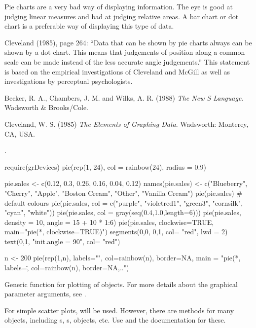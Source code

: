 %
\begin{Note}\relax
Pie charts are a very bad way of displaying information.
The eye is good at judging linear measures and bad at judging
relative areas.  A bar chart or dot chart is a preferable way of
displaying this type of data.

Cleveland (1985), page 264: ``Data that can be shown by pie charts
always can be shown by a dot chart.  This means that judgements of
position along a common scale can be made instead of the less
accurate angle judgements.''
This statement is based on the empirical investigations of Cleveland
and McGill as well as investigations by perceptual psychologists.
\end{Note}
%
\begin{References}\relax
Becker, R. A., Chambers, J. M. and Wilks, A. R. (1988)
\emph{The New S Language}.
Wadsworth \& Brooks/Cole.

Cleveland, W. S. (1985)
\emph{The Elements of Graphing Data}.
Wadsworth: Monterey, CA, USA.
\end{References}
%
\begin{SeeAlso}\relax
{}.
\end{SeeAlso}
%
\begin{Examples}
\begin{ExampleCode}
require(grDevices)
pie(rep(1, 24), col = rainbow(24), radius = 0.9)

pie.sales <- c(0.12, 0.3, 0.26, 0.16, 0.04, 0.12)
names(pie.sales) <- c("Blueberry", "Cherry",
    "Apple", "Boston Cream", "Other", "Vanilla Cream")
pie(pie.sales) # default colours
pie(pie.sales, col = c("purple", "violetred1", "green3",
                       "cornsilk", "cyan", "white"))
pie(pie.sales, col = gray(seq(0.4,1.0,length=6)))
pie(pie.sales, density = 10, angle = 15 + 10 * 1:6)
pie(pie.sales, clockwise=TRUE, main="pie(*, clockwise=TRUE)")
segments(0,0, 0,1, col= "red", lwd = 2)
text(0,1, "init.angle = 90", col= "red")

n <- 200
pie(rep(1,n), labels="", col=rainbow(n), border=NA,
    main = "pie(*, labels=\"\", col=rainbow(n), border=NA,..")
\end{ExampleCode}
\end{Examples}
%
\begin{Description}\relax
Generic function for plotting of \R{} objects.  For more details about
the graphical parameter arguments, see .

For simple scatter plots,  will be used.
However, there are  methods for many \R{} objects,
including s, s,
 objects, etc.  Use  and
the documentation for these.
\end{Description}
